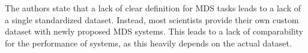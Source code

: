 \documentclass[20_original-paper.tex]{subfiles}
\begin{document}


The authors state that a lack of clear definition for MDS tasks leads to a lack of a single standardized dataset.
Instead, most scientists provide their own custom dataset with newly proposed MDS systems.
This leads to a lack of comparability for the performance of systems, as this heavily depends on the actual dataset.\cite{dey-etal-2020-corpora}
\end{document}
